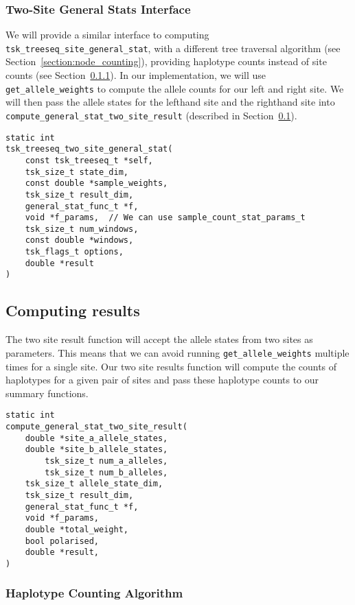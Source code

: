 \documentclass[12pt]{article}
\newcommand{\ccode}[1]{\texttt{#1}}
\begin{document}
\subsubsection{Two-Site General Stats Interface}
We will provide a similar interface to computing
\ccode{tsk_treeseq_site_general_stat}, with a different tree traversal algorithm
(see Section~\ref{section:node_counting}), providing haplotype counts instead of
site counts (see Section~\ref{section:hap_counting}). In our implementation, we
will use \ccode{get_allele_weights} to compute the allele counts for our left
and right site. We will then pass the allele states for the lefthand site and
the righthand site into \ccode{compute_general_stat_two_site_result} (described
in Section~\ref{section:computing_results}).

\begin{verbatim}
static int
tsk_treeseq_two_site_general_stat(
	const tsk_treeseq_t *self,
	tsk_size_t state_dim,
	const double *sample_weights,
	tsk_size_t result_dim,
	general_stat_func_t *f,
	void *f_params,  // We can use sample_count_stat_params_t
	tsk_size_t num_windows,
	const double *windows,
	tsk_flags_t options,
	double *result
)
\end{verbatim}

\subsection{Computing results}\label{section:computing_results}

The two site result function will accept the allele states from two sites as
parameters. This means that we can avoid running \ccode{get_allele_weights}
multiple times for a single site. Our two site results function will compute the
counts of haplotypes for a given pair of sites and pass these haplotype counts
to our summary functions.

\begin{verbatim}
static int
compute_general_stat_two_site_result(
	double *site_a_allele_states,
	double *site_b_allele_states,
        tsk_size_t num_a_alleles,
        tsk_size_t num_b_alleles,
	tsk_size_t allele_state_dim,
	tsk_size_t result_dim,
	general_stat_func_t *f,
	void *f_params,
	double *total_weight,
	bool polarised,
	double *result,
)
\end{verbatim}

\subsubsection{Haplotype Counting Algorithm}\label{section:hap_counting}
\end{document}
